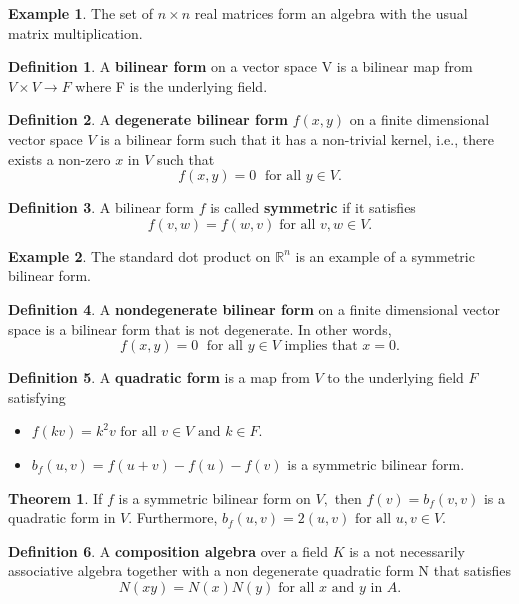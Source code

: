 \documentclass[11pt]{report}
\theoremstyle{plain}
\theoremstyle{definition}
\newtheorem{defn}{Definition}
\newtheorem{exmp}{Example} %
\newtheorem{theorem}{Theorem}
\begin{document}
\begin{exmp}
The set of $ n \times n $ real matrices form an algebra with the usual matrix multiplication.
\end{exmp}
\begin{defn}
	A \textbf{bilinear form} on a vector space V is a bilinear map from $ V \times V \rightarrow F $ where F is the underlying field.
\end{defn} 
\begin{defn}
	A \textbf{degenerate bilinear form} $ f(x,y) $ on a finite dimensional vector space $ V $ is a bilinear form such that it has a non-trivial kernel, i.e., there exists a non-zero $ x $ in $ V $ such that $$ f(x,y) = 0 \; \text{ for all } y \in V.$$
\end{defn}
\begin{defn}
	A bilinear form $ f $ is called \textbf{symmetric} if it satisfies $$ f(v,w) = f(w,v) \; \text{for all } v,w \in V. $$
\end{defn}
\begin{exmp}
The standard dot product on $ \mathbb{R}^n $ is an example of a symmetric bilinear form.
\end{exmp}
\begin{defn}
	A \textbf{nondegenerate bilinear form} on a finite dimensional vector space is a bilinear form that is not degenerate. In other words, $$ f(x,y) = 0 \; \text{ for all } y \in V \text{ implies that } x = 0.$$
\end{defn}
\begin{defn}
	A \textbf{quadratic form} is a map from $ V $ to the underlying field $ F $ satisfying
	\begin{itemize}
		\item $ f(kv) = k^2 v \text{ for all } v \in V \text{ and } k \in F. $
		\item $ b_f(u,v) = f(u+v) - f(u) - f(v) $ is a symmetric bilinear form.
	\end{itemize}
\end{defn}
\begin{theorem}
	If $ f $ is a symmetric bilinear form on $ V, $ then $ f(v) = b_f(v,v) $ is a quadratic form in $ V. $ Furthermore, $ b_f(u,v) = 2 (u,v) \text{ for all } u,v \in V.$
\end{theorem}
\begin{defn}
	A \textbf{composition algebra} over a field $ K $ is a not necessarily associative algebra together with a non degenerate quadratic form N that satisfies $$ N(xy) = N(x)N(y) \; \text{for all } x \text{ and } y \text{ in }A.$$ 
\end{defn}
\end{document}
